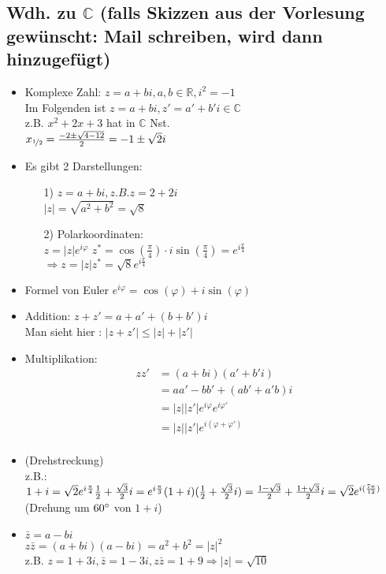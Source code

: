 \documentclass[12pt,titlepage, pdf]{article}
\newcommand{\R}{\mathds{R}}
\newcommand{\C}{\mathds{C}}
\renewcommand{\>}{\rightarrow}
\renewcommand{\*}{\cdot}
\renewcommand{\phi}{\varphi}
\begin{document}
\subsection*{Wdh. zu $\C$ (falls Skizzen aus der Vorlesung gewünscht: Mail schreiben, wird dann hinzugefügt)}
\begin{itemize}
	\item Komplexe Zahl: $z = a +bi, a,b \in \R, i^2 = -1$\\
	Im Folgenden ist $z = a +bi, z' = a' + b'i \in \C$\\
	z.B. $x^2 + 2x +3$ hat in $\C$ Nst.\\
	$x_{\nicefrac{1}{2}} = \frac{-2 \pm \sqrt{4-12}}{2} = -1 \pm \sqrt{2}i$\\
	\item Es gibt 2 Darstellungen: \\		
	\begin{itemize}
		\item[1)]
		$z = a +bi, z.B. z = 2 + 2i$\\
		$|z| = \sqrt{a^2 + b^2} = \sqrt{8}$
		\item[2)]
		Polarkoordinaten: \\
		$z = |z| e^{i\phi}$
		$z^* = \cos(\frac{\pi}{4}) \cdot i \sin(\frac{\pi}{4}) = e^{i\frac{\pi}{4}}$ \\
		$\Rightarrow z = |z| z^* = \sqrt{8} e^{i\frac{\pi}{4}}$
	\end{itemize} 
	\item Formel von Euler $e^{i\phi} = \cos(\phi) + i \sin(\phi)$
	\item Addition: $z + z' = a +a' + (b+ b')i$ \\
	Man sieht hier : $ |z + z'| \leq |z| + |z'|$
	\item Multiplikation: 
	\begin{align*}
	zz' &= (a + bi)(a'+b'i)\\
	&= aa' - bb'+(ab'+a'b)i\\
	&= |z| |z'| e^{i\phi}e^{i\phi'} \\
	&= |z||z'| e^{i(\phi + \phi')} \\
	\end{align*}
	\item (Drehstreckung)\\
	z.B.:\\
	$1+i = \sqrt{2}e^{i\frac{\pi}{4}}\\
	\frac{1}{2} + \frac{\sqrt{3}}{2}i = e^{i\frac{\pi}{3}}\\
	(1+i)(\frac{1}{2} + \frac{\sqrt{3}}{2}i) = \frac{1- \sqrt{3}}{2} + \frac{1+ \sqrt{3}}{2}i = \sqrt{2}e^{i(\frac{7\pi}{12})}$\\
	(Drehung um $60 \degree$ von $1+i$)
	\item $\bar{z} = a -bi$\\
	$z\bar{z} = (a+bi)(a-bi) = a^2 + b^2 = |z|^2$\\
	z.B. $z = 1 +3i, \bar{z} = 1 - 3i, z\bar{z} = 1 + 9 \Rightarrow |z| = \sqrt{10}$ \\
\end{itemize}
\newpage
\end{document}

